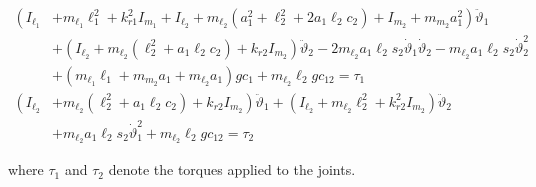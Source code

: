 \documentclass[10pt]{article}
\begin{document}
$$
\begin{aligned}
\left(I_{\ell_{1}}\right. & \left.+m_{\ell_{1}} \ell_{1}^{2}+k_{r 1}^{2} I_{m_{1}}+I_{\ell_{2}}+m_{\ell_{2}}\left(a_{1}^{2}+\ell_{2}^{2}+2 a_{1} \ell_{2} c_{2}\right)+I_{m_{2}}+m_{m_{2}} a_{1}^{2}\right) \ddot{\vartheta}_{1} \\
& +\left(I_{\ell_{2}}+m_{\ell_{2}}\left(\ell_{2}^{2}+a_{1} \ell_{2} c_{2}\right)+k_{r 2} I_{m_{2}}\right) \ddot{\vartheta}_{2}  -2 m_{\ell_{2}} a_{1} \ell_{2} s_{2} \dot{\vartheta}_{1} \dot{\vartheta}_{2}-m_{\ell_{2}} a_{1} \ell_{2} s_{2} \dot{\vartheta}_{2}^{2} \\
& +\left(m_{\ell_{1}} \ell_{1}+m_{m_{2}} a_{1}+m_{\ell_{2}} a_{1}\right) g c_{1}+m_{\ell_{2}} \ell_{2} g c_{12}=\tau_{1} \\
\left(I_{\ell_{2}}\right. & \left.+m_{\ell_{2}}\left(\ell_{2}^{2}+a_{1} \ell_{2} c_{2}\right)+k_{r 2} I_{m_{2}}\right) \ddot{\vartheta}_{1}+\left(I_{\ell_{2}}+m_{\ell_{2}} \ell_{2}^{2}+k_{r 2}^{2} I_{m_{2}}\right) \ddot{\vartheta}_{2} \\
& +m_{\ell_{2}} a_{1} \ell_{2} s_{2} \dot{\vartheta}_{1}^{2}+m_{\ell_{2}} \ell_{2} g c_{12}=\tau_{2}
\end{aligned}
$$

where $\tau_{1}$ and $\tau_{2}$ denote the torques applied to the joints.
\end{document}
